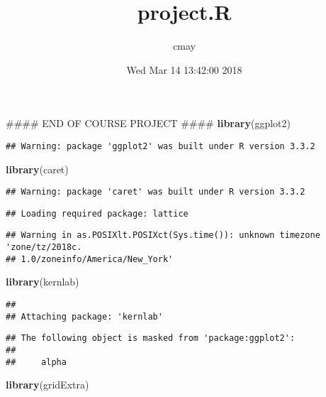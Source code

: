 \documentclass[]{article}
\title{project.R}
\author{cmay}
\date{Wed Mar 14 13:42:00 2018}
\newenvironment{Shaded}{\begin{snugshade}}{\end{snugshade}}
\newcommand{\KeywordTok}[1]{\textcolor[rgb]{0.13,0.29,0.53}{\textbf{{#1}}}}
\newcommand{\NormalTok}[1]{{#1}}
\begin{document}
\maketitle

\begin{Shaded}
\begin{Highlighting}[]
\NormalTok{#### END OF COURSE PROJECT ####}
\KeywordTok{library}\NormalTok{(ggplot2)}
\end{Highlighting}
\end{Shaded}

\begin{verbatim}
## Warning: package 'ggplot2' was built under R version 3.3.2
\end{verbatim}

\begin{Shaded}
\begin{Highlighting}[]
\KeywordTok{library}\NormalTok{(caret)}
\end{Highlighting}
\end{Shaded}

\begin{verbatim}
## Warning: package 'caret' was built under R version 3.3.2
\end{verbatim}

\begin{verbatim}
## Loading required package: lattice
\end{verbatim}

\begin{verbatim}
## Warning in as.POSIXlt.POSIXct(Sys.time()): unknown timezone 'zone/tz/2018c.
## 1.0/zoneinfo/America/New_York'
\end{verbatim}

\begin{Shaded}
\begin{Highlighting}[]
\KeywordTok{library}\NormalTok{(kernlab)}
\end{Highlighting}
\end{Shaded}

\begin{verbatim}
## 
## Attaching package: 'kernlab'
\end{verbatim}

\begin{verbatim}
## The following object is masked from 'package:ggplot2':
## 
##     alpha
\end{verbatim}

\begin{Shaded}
\begin{Highlighting}[]
\KeywordTok{library}\NormalTok{(gridExtra)}
\end{Highlighting}
\end{Shaded}
\end{document}
